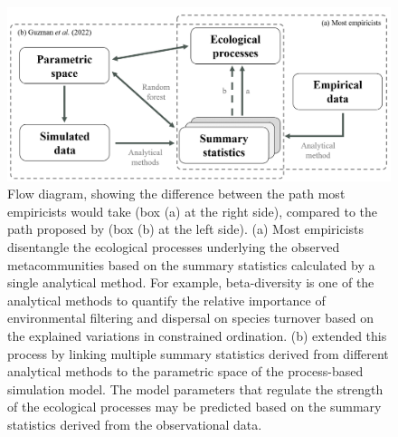 \begin{figure}
	\centering
	\includegraphics[width=\linewidth]{./figures/ppt/framework.png}
	\caption[Difference between the path most empiricists would take with the path proposed by \citet{guzman2022accounting}.]{\small
		Flow diagram, showing the difference between the path most empiricists would take (box (a) at the right side), compared to the path proposed by \citet{guzman2022accounting} (box (b) at the left side). (a) Most empiricists disentangle the ecological processes underlying the observed metacommunities based on the summary statistics calculated by a single analytical method. For example, beta-diversity is one of the analytical methods to quantify the relative importance of environmental filtering and dispersal on species turnover based on the explained variations in constrained ordination. (b) \citet{guzman2022accounting} extended this process by linking multiple summary statistics derived from different analytical methods to the parametric space of the process-based simulation model. The model parameters that regulate the strength of the ecological processes may be predicted based on the summary statistics derived from the observational data.}
	\label{fig:framework}
\end{figure}

